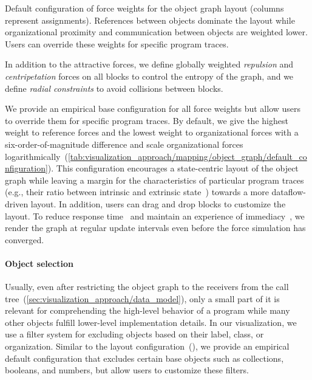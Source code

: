 \begin{table}
	\centering
	\caption{
		Default configuration of force weights for the object graph layout (columns represent assignments).
		References between objects dominate the layout while organizational proximity and communication between objects are weighted lower.
		Users can override these weights for specific program traces.
	}
	\label{tab:visualization_approach/mapping/object_graph/default_configuration}
	\begin{threeparttable}
		\centering
		{\footnotesize
		}
	\end{threeparttable}
\end{table}

In addition to the attractive forces, we define globally weighted \emph{repulsion} and \emph{centripetation} forces on all blocks to control the entropy of the graph, and we define \emph{radial constraints} to avoid collisions between blocks.

We provide an empirical base configuration for all force weights but allow users to override them for specific program traces.
By default, we give the highest weight to reference forces and the lowest weight to organizational forces with a six-order-of-magnitude difference and scale organizational forces logarithmically~(\cref{tab:visualization_approach/mapping/object_graph/default_configuration}).
This configuration encourages a state-centric layout of the object graph while leaving a margin for the characteristics of particular program traces (e.g., their ratio between intrinsic and extrinsic state~\cite[p. 218ff]{gamma1994design}) towards a more dataflow-driven layout.
In addition, users can drag and drop blocks to customize the layout.
To reduce response time~\cite[chap. 11]{shneiderman2005designing} and maintain an experience of immediacy~\cite{ungar1997debugging}, we render the graph at regular update intervals even before the force simulation has converged.

\paragraph{Object selection}
\label{sec:visualization_approach/mapping/object_selection}

Usually, even after restricting the object graph to the receivers from the call tree~(\cref{sec:visualization_approach/data_model}), only a small part of it is relevant for comprehending the high-level behavior of a program while many other objects fulfill lower-level implementation details.
In our visualization, we use a filter system for excluding objects based on their label, class, or organization.
Similar to the layout configuration~(), we provide an empirical default configuration that excludes certain base objects such as collections, booleans, and numbers, but allow users to customize these filters.

